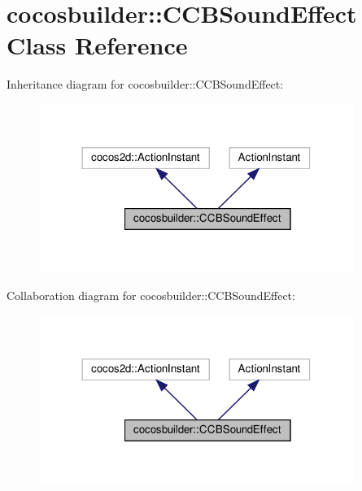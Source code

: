 \hypertarget{classcocosbuilder_1_1CCBSoundEffect}{}\section{cocosbuilder\+:\+:C\+C\+B\+Sound\+Effect Class Reference}
\label{classcocosbuilder_1_1CCBSoundEffect}


Inheritance diagram for cocosbuilder\+:\+:C\+C\+B\+Sound\+Effect\+:
\nopagebreak
\begin{figure}[H]
\begin{center}
\leavevmode
\includegraphics[width=290pt]{classcocosbuilder_1_1CCBSoundEffect__inherit__graph}
\end{center}
\end{figure}


Collaboration diagram for cocosbuilder\+:\+:C\+C\+B\+Sound\+Effect\+:
\nopagebreak
\begin{figure}[H]
\begin{center}
\leavevmode
\includegraphics[width=290pt]{classcocosbuilder_1_1CCBSoundEffect__coll__graph}
\end{center}
\end{figure}
